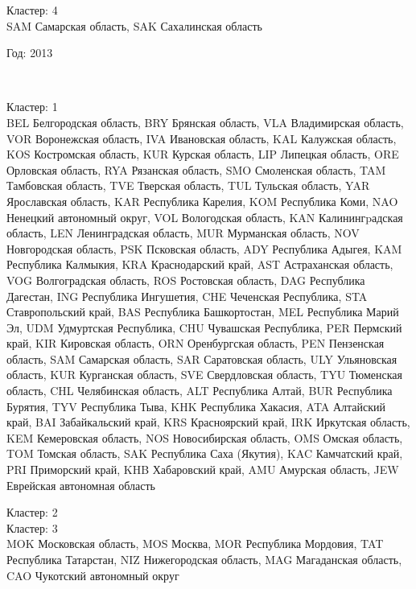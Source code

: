 \documentclass[11pt]{article}
\begin{document}
Кластер:  4 \\
SAM Самарская область, SAK Сахалинская область

\begin{center}
Год:  2013
\end{center}

    \begin{center}
    \end{center}
    { \hspace*{\fill} \\}
    

Кластер:  1 \\
BEL Белгородская область, BRY Брянская область, VLA Владимирская область, VOR Воронежская область, IVA Ивановская область, KAL Калужская область, KOS Костромская область, KUR Курская область, LIP Липецкая область, ORE Орловская область, RYA Рязанская область, SMO Смоленская область, TAM Тамбовская область, TVE Тверская область, TUL Тульская область, YAR Ярославская область, KAR Республика Карелия, KOM Республика Коми, NAO Ненецкий автономный округ, VOL Вологодская область, KAN Калинингpадская область, LEN Ленинградская область, MUR Мурманская область, NOV Новгородская область, PSK Псковская область, ADY Республика Адыгея, KAM Республика Калмыкия, KRA Краснодарский край, AST Астраханская область, VOG Волгоградская область, ROS Ростовская область, DAG Республика Дагестан, ING Республика Ингушетия, CHE Чеченская Республика, STA Ставропольский край, BAS Республика Башкортостан, MEL Республика Марий Эл, UDM Удмуртская Республика, CHU Чувашская Республика, PER Пермский край, KIR Кировская область, ORN Оренбургская область, PEN Пензенская область, SAM Самарская область, SAR Саратовская область, ULY Ульяновская область, KUR Курганская область, SVE Свердловская область, TYU Тюменская область, CHL Челябинская область, ALT Республика Алтай, BUR Республика Бурятия, TYV Республика Тыва, KHK Республика Хакасия, ATA Алтайский край, BAI Забайкальский край, KRS Красноярский край, IRK Иркутская область, KEM Кемеровская область, NOS Новосибирская область, OMS Омская область, TOM Томская область, SAK Республика Саха (Якутия), KAC Камчатский край, PRI Приморский край, KHB Хабаровский край, AMU Амурская область, JEW Еврейская автономная область

Кластер:  2 \\


Кластер:  3 \\
MOK Московская область, MOS Москва, MOR Республика Мордовия, TAT Республика Татарстан, NIZ Нижегородская область, MAG Магаданская область, CAO Чукотский автономный округ
\end{document}
